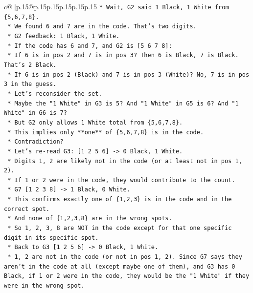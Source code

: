 \documentclass{article}
\begin{document}
{\begin{supertabular}{c@{$\;$}|p{.15\linewidth}@{}p{.15\linewidth}p{.15\linewidth}p{.15\linewidth}p{.15\linewidth}p{.15\linewidth}}
{{{\texttt{*   Wait, G2 said 1 Black, 1 White from \{5,6,7,8\}.} \\
\texttt{    *   We found 6 and 7 are in the code. That's two digits.} \\
\texttt{    *   G2 feedback: 1 Black, 1 White.} \\
\texttt{    *   If the code has 6 and 7, and G2 is {[}5 6 7 8{]}:} \\
\texttt{        *   If 6 is in pos 2 and 7 is in pos 3? Then 6 is Black, 7 is Black. That's 2 Black.} \\
\texttt{        *   If 6 is in pos 2 (Black) and 7 is in pos 3 (White)? No, 7 is in pos 3 in the guess.} \\
\texttt{        *   Let's reconsider the set.} \\
\texttt{        *   Maybe the "1 White" in G3 is 5? And "1 White" in G5 is 6? And "1 White" in G6 is 7?} \\
\texttt{        *   But G2 only allows 1 White total from \{5,6,7,8\}.} \\
\texttt{        *   This implies only **one** of \{5,6,7,8\} is in the code.} \\
\texttt{        *   Contradiction?} \\
\texttt{        *   Let's re{-}read G3: {[}1 2 5 6{]} {-}> 0 Black, 1 White.} \\
\texttt{            *   Digits 1, 2 are likely not in the code (or at least not in pos 1, 2).} \\
\texttt{            *   If 1 or 2 were in the code, they would contribute to the count.} \\
\texttt{            *   G7 {[}1 2 3 8{]} {-}> 1 Black, 0 White.} \\
\texttt{                *   This confirms exactly one of \{1,2,3\} is in the code and in the correct spot.} \\
\texttt{                *   And none of \{1,2,3,8\} are in the wrong spots.} \\
\texttt{                *   So 1, 2, 3, 8 are NOT in the code except for that one specific digit in its specific spot.} \\
\texttt{            *   Back to G3 {[}1 2 5 6{]} {-}> 0 Black, 1 White.} \\
\texttt{                *   1, 2 are not in the code (or not in pos 1, 2). Since G7 says they aren't in the code at all (except maybe one of them), and G3 has 0 Black, if 1 or 2 were in the code, they would be the "1 White" if they were in the wrong spot.} \\
}}}
\end{supertabular}}
\end{document}
